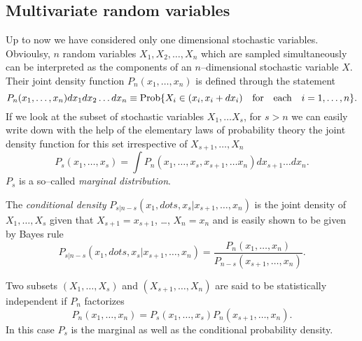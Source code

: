 \subsection{Multivariate random variables}
Up to now we have considered only one dimensional stochastic 
variables. Obvioulsy, $n$ random variables $X_1, X_2, \ldots, X_n$ 
which are sampled simultaneously can be interpreted as the 
components of an $n$--dimensional stochastic variable $X$.
Their joint density function
$P_n(x_1, \ldots, x_n)$ is defined through the statement
\begin{equation}
P_n(x_1, \ldots, x_n)dx_1 dx_2 \ldots dx_n \equiv
{\rm Prob}\{ X_i \in (x_i,x_i+dx_i) \quad {\rm for \quad
each \quad} i=1, \ldots , n\}.
\end{equation}
If we look at the subset of stochastic variables $X_1, \ldots 
X_s$, for $s>n$ we can easily write down with the help of the
elementary laws of probability theory the joint density function for 
this set irrespective of $X_{s+1}, \ldots, X_n$
\begin{equation}
P_s(x_1, \ldots, x_s) = \int P_n(x_1, \ldots, x_s, x_{s+1}, \ldots 
x_n) dx_{s+1} \ldots dx_{n}.
\end{equation}
$P_s$ is a so--called {\em marginal distribution}.

The {\em conditional density} 
$P_{s|n-s}(x_1,dots,x_s|x_{s+1},\ldots,x_n)$ is the joint 
density of $X_1, \ldots , X_s$
given that $X_{s+1}=x_{s+1}$, \ldots , $X_n = x_n$ and is easily 
shown to be given by Bayes rule
\begin{equation}
P_{s|n-s}(x_1,dots,x_s|x_{s+1},\ldots,x_n) =
\frac{P_n(x_1, \ldots, x_n)}{P_{n-s}(x_{s+1}, \ldots, x_n)}.
\end{equation}

Two subsets $(X_1, \ldots, X_s)$ and $(X_{s+1}, \ldots, X_n)$ are 
said to be statistically  independent if $P_n$ factorizes
\begin{equation}
P_n(x_1, \ldots, x_n)=P_s(x_1, \ldots, x_s)P_n(x_{s+1}, \ldots, 
x_n).
\end{equation}
In this case $P_s$ is the marginal as well as the conditional 
probability density.

